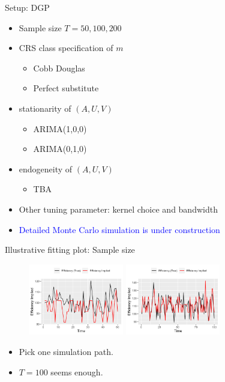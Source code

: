\documentclass[aspectratio=169]{beamer}
\begin{document}
\begin{frame}{Setup: DGP}
\begin{itemize}
    \item Sample size $T=50,100, 200$
    \item CRS class specification of $m$
    \begin{itemize}
        \item Cobb Douglas
        \item Perfect substitute
    \end{itemize}
    \item stationarity of $(A,U,V)$
    \begin{itemize}
        \item ARIMA(1,0,0)
        \item ARIMA(0,1,0)
    \end{itemize}
    \item endogeneity of $(A,U,V)$
    \begin{itemize}
        \item TBA
    \end{itemize}
    \item Other tuning parameter: kernel choice and bandwidth 
    \item  \textcolor{blue}{Detailed Monte Carlo simulation is under construction}
\end{itemize}
    
\end{frame}

\begin{frame}{Illustrative fitting plot: Sample size}
\begin{figure}[!ht]
  \begin{center}

  \includegraphics[width = 0.37\textwidth]
  {figuretable/illustrative_plot_implied_efficiency_num_time_50_cobb_douglas_0.3_AR1_I0.png}
  \includegraphics[width = 0.37\textwidth]
  {figuretable/illustrative_plot_implied_efficiency_num_time_100_cobb_douglas_0.3_AR1_I0.png}
  \end{center}
  \footnotesize
\end{figure}
\begin{itemize}
     \item Pick one simulation path.
     \item $T=100$ seems enough.
\end{itemize}
\end{frame}
\end{document}
